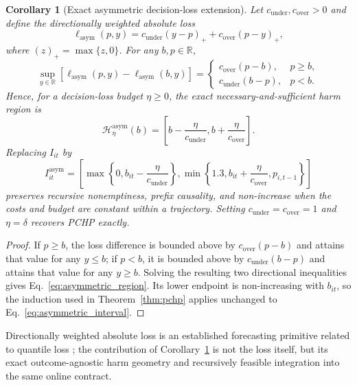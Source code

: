\documentclass[11pt]{article}
\newtheorem{corollary}{Corollary}
\newcommand{\R}{\mathbb{R}}
\begin{document}
\begin{corollary}[Exact asymmetric decision-loss extension]
\label{cor:asymmetric}
Let $c_{\mathrm{under}},c_{\mathrm{over}}>0$ and define the directionally weighted absolute loss
\begin{equation}
  \ell_{\mathrm{asym}}(p,y)
  =c_{\mathrm{under}}(y-p)_{+}
  +c_{\mathrm{over}}(p-y)_{+},
  \label{eq:asymmetric_loss}
\end{equation}
where $(z)_{+}=\max\{z,0\}$. For any $b,p\in\R$,
\begin{equation}
  \sup_{y\in\R}\!\left[
  \ell_{\mathrm{asym}}(p,y)-\ell_{\mathrm{asym}}(b,y)
  \right]
  =
  \begin{cases}
    c_{\mathrm{over}}(p-b), & p\geq b,\\
    c_{\mathrm{under}}(b-p), & p<b.
  \end{cases}
  \label{eq:asymmetric_identity}
\end{equation}
Hence, for a decision-loss budget $\eta\geq0$, the exact necessary-and-sufficient harm region is
\begin{equation}
  \mathcal H^{\mathrm{asym}}_{\eta}(b)
  =\left[b-\frac{\eta}{c_{\mathrm{under}}},
          b+\frac{\eta}{c_{\mathrm{over}}}\right].
  \label{eq:asymmetric_region}
\end{equation}
Replacing $I_{it}$ by
\begin{equation}
  I^{\mathrm{asym}}_{it}
  =\left[
  \max\!\left\{0,b_{it}-\frac{\eta}{c_{\mathrm{under}}}\right\},
  \min\!\left\{1.3,b_{it}+\frac{\eta}{c_{\mathrm{over}}},p_{i,t-1}\right\}
  \right]
  \label{eq:asymmetric_interval}
\end{equation}
preserves recursive nonemptiness, prefix causality, and non-increase when the costs and budget are constant within a trajectory. Setting $c_{\mathrm{under}}=c_{\mathrm{over}}=1$ and $\eta=\delta$ recovers PCHP exactly.
\end{corollary}
\begin{proof}
If $p\geq b$, the loss difference is bounded above by $c_{\mathrm{over}}(p-b)$ and attains that value for any $y\leq b$; if $p<b$, it is bounded above by $c_{\mathrm{under}}(b-p)$ and attains that value for any $y\geq b$. Solving the resulting two directional inequalities gives Eq.~\eqref{eq:asymmetric_region}. Its lower endpoint is non-increasing with $b_{it}$, so the induction used in Theorem~\ref{thm:pchp} applies unchanged to Eq.~\eqref{eq:asymmetric_interval}.
\end{proof}

Directionally weighted absolute loss is an established forecasting primitive related to quantile loss \citep{koenker1978regression}; the contribution of Corollary~\ref{cor:asymmetric} is not the loss itself, but its exact outcome-agnostic harm geometry and recursively feasible integration into the same online contract.
\end{document}
